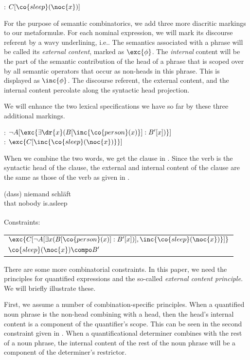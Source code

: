 \documentclass[output=paper]{langsci/langscibook}
\begin{document}
\ea \label{le-schlaeft}
 : $C[\co{sleep}(\noc{x})]$
\z 

For the purpose of semantic combinatorics, we add three more diacritic markings to our metaformulæ. 
For each nominal expression, we will mark its discourse referent by a wavy underlining, 
i.e.\@ {}. 
The semantics associated with a phrase will be called its \emph{external content}, marked as $\exc{\phi}$. The \emph{internal} content will be the part of the semantic contribution of the head of a phrase 
that is scoped over by all semantic operators that occur as non-heads in this phrase. 
This 
is displayed as $\inc{\phi}$. The discourse referent, the external content, and the internal content percolate along the syntactic head projection.

We will enhance the two lexical specifications we have so far by these three additional markings.

\ea \label{le-niemand-schlaeft-diacritic}
: $\lnot A[\exc{\exists \dr{x} (B[\inc{\co{person}(x)}] : B'[x])}]$\\
: $\exc{C[\inc{\co{sleep}(\noc{x})}}]$
\z


When we combine the two words, we get the clause in . Since the verb is the syntactic head of the clause, the external and internal content of the clause are the same as those of the verb as given in .

\ea \label{niemand-schlaeft}
\gll (dass) niemand schläft\\
that nobody is.asleep\\
\glt {}\\
Constraints: \begin{tabular}[t]{l}
$\exc{C[\lnot A[\exists x (B[\co{person}(x)] : B'[x])], \inc{\co{sleep}(\noc{x})}]}$\\
$\co{sleep}(\noc{x}) \compo B'$
\end{tabular}
\z 

There are some more combinatorial constraints. In this paper, we need the principles for quantified expressions and the so-called \emph{external content principle}. We will briefly illustrate these.

First, we assume a number of combination-specific principles. When a quantified noun phrase is the non-head combining  with a head, then the head's internal content is a component of the quantifier's scope. This can be seen in the second constraint given in . When a quantificational determiner combines with the rest of a noun phrase, the internal content of the rest of the noun phrase will be a component of the determiner's restrictor.
\end{document}
